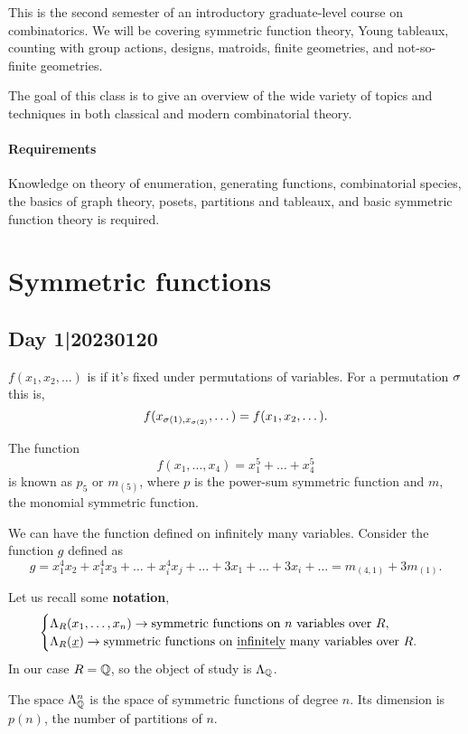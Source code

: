 \documentclass[12pt]{memoir}
\begin{document}
\maketitle
{\small 
\setlength{\parindent}{0em}
\setlength{\parskip}{1em}

This is the second semester of an introductory graduate-level course on combinatorics. We will be covering symmetric function theory, Young tableaux, counting with group actions, designs, matroids, finite geometries, and not-so-finite geometries.\par 
The goal of this class is to give an overview of the wide variety of topics and techniques in both classical and modern combinatorial theory.

\subsubsection*{Requirements}
Knowledge on theory of enumeration, generating functions, combinatorial species, the basics of graph theory, posets, partitions and tableaux, and basic symmetric function theory is required.
}
\newpage
\tableofcontents
\chapter{Symmetric functions}

\section{Day 1|20230120}
\begin{Def}
$f(x_1,x_2,\dots)$ is  if it's fixed under permutations of variables. For a permutation $\sigma$ this is, 
$$f(x_{\sigma(1),x_{\sigma(2)}},\dots)=f(x_1,x_2,\dots).$$
\end{Def}

\begin{Ex}
    The function 
    $$f(x_1,\dots,x_4)=x_1^5+\dots+x_4^5$$ 
    is known as $p_5$ or $m_{(5)}$, where $p$ is the power-sum symmetric function and $m$, the monomial symmetric function.\par 
    We can have the function defined on infinitely many variables. Consider the function $g$ defined as 
    $$g=x_1^4x_2+x_1^4x_3+\dots+x_i^4x_j+\dots+3x_1+\dots+3x_i+\dots=m_{(4,1)}+3m_{(1)}.$$ 
\end{Ex}

Let us recall some \textbf{notation}, 
$$
\begin{cases}
    \Lambda_R(x_1,\dots,x_n)\to\text{symmetric functions on }n\text{ variables over }R,\\
    \Lambda_R(\underline{x})\to\text{symmetric functions on \emph{infinitely} many variables over }R.
\end{cases}
$$
In our case $R=\mathbb{Q}$, so the object of study is $\Lambda_{\mathbb{Q}}$.
\begin{Prop}\label{prop-dim-LambdaQ}
    The space $\Lambda_{\mathbb{Q}}^n$ is the space of symmetric functions of degree $n$. Its dimension is $p(n)$, the number of partitions of $n$.
\end{Prop}
\end{document}
